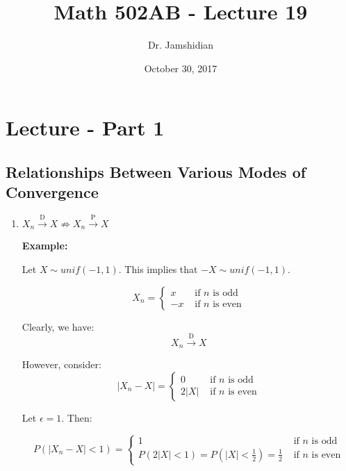 \documentclass{article}
\title{Math 502AB - Lecture 19}
\author{Dr. Jamshidian}
\date{October 30, 2017}
\begin{document}
\maketitle

\section{Lecture - Part 1}

\subsection{Relationships Between Various Modes of Convergence}
\begin{enumerate}
    \item $X_n \xrightarrow{\text{D}} X \not\Rightarrow X_n \xrightarrow{\text{P}} X$
    
    \textbf{Example:}
    
    Let $X \sim unif(-1,1)$. This implies that $-X \sim unif(-1,1)$.
    
    \begin{equation*}
        X_n = \begin{cases}
            x & \text{ if $n$ is odd}\\
            -x & \text{ if $n$ is even}
        \end{cases}
    \end{equation*}
    
    Clearly, we have:
    \begin{equation*}
        X_n \xrightarrow{\text{D}} X
    \end{equation*}
    
    However, consider:
    \begin{equation*}
        |X_n-X| = \begin{cases}
            0 & \text{ if $n$ is odd}\\
            2|X| & \text{ if $n$ is even}
        \end{cases}
    \end{equation*}
    
    Let $\epsilon = 1$. Then:
    
    \begin{equation*}
        P(|X_n-X|<1) = \begin{cases}
            1 & \text{ if $n$ is odd}\\
            P(2|X|<1) = P(|X|<\frac{1}{2}) = \frac{1}{2} & \text{ if $n$ is even}
        \end{cases}
    \end{equation*}
    

\end{enumerate}
\end{document}
